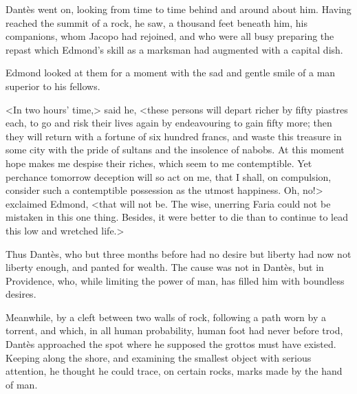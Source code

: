  Dantès went on, looking from time to time behind and around about him. Having reached the summit of a rock, he saw, a thousand feet beneath him, his companions, whom Jacopo had rejoined, and who were all busy preparing the repast which Edmond's skill as a marksman had augmented with a capital dish. 

 Edmond looked at them for a moment with the sad and gentle smile of a man superior to his fellows. 

 <In two hours' time,> said he, <these persons will depart richer by fifty piastres each, to go and risk their lives again by endeavouring to gain fifty more; then they will return with a fortune of six hundred francs, and waste this treasure in some city with the pride of sultans and the insolence of nabobs. At this moment hope makes me despise their riches, which seem to me contemptible. Yet perchance tomorrow deception will so act on me, that I shall, on compulsion, consider such a contemptible possession as the utmost happiness. Oh, no!> exclaimed Edmond, <that will not be. The wise, unerring Faria could not be mistaken in this one thing. Besides, it were better to die than to continue to lead this low and wretched life.> 

 Thus Dantès, who but three months before had no desire but liberty had now not liberty enough, and panted for wealth. The cause was not in Dantès, but in Providence, who, while limiting the power of man, has filled him with boundless desires. 

 Meanwhile, by a cleft between two walls of rock, following a path worn by a torrent, and which, in all human probability, human foot had never before trod, Dantès approached the spot where he supposed the grottos must have existed. Keeping along the shore, and examining the smallest object with serious attention, he thought he could trace, on certain rocks, marks made by the hand of man. 

